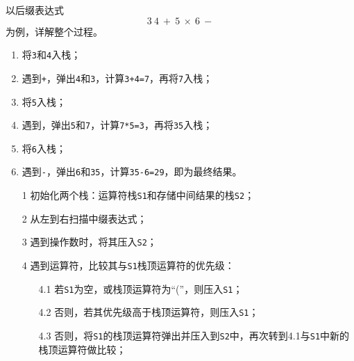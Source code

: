 \begin{frame}
\begin{li}
以后缀表达式
$$
3~4~+~5~\times~6~-
$$
为例，详解整个过程。
\end{li}
\end{frame}

\begin{frame}
\begin{enumerate}
\item 将{\tt 3}和{\tt 4}入栈；
\item 遇到{\tt +}，弹出{\tt 4}和{\tt 3}，计算{\tt 3+4=7}，再将{\tt 7}入栈；
\item 将{\tt 5}入栈；
\item 遇到{\tt *}，弹出{\tt 5}和{\tt 7}，计算{\tt 7*5=3}，再将{\tt 35}入栈；
\item 将{\tt 6}入栈；
\item 遇到{\tt -}，弹出{\tt 6}和{\tt 35}，计算{\tt 35-6=29}，即为最终结果。
\end{enumerate}
\end{frame}

\begin{frame}
\begin{itemize}
\item[1] 初始化两个栈：运算符栈{\tt S1}和存储中间结果的栈{\tt S2}；\\[0.1in]
\item[2] 从左到右扫描中缀表达式；\\[0.1in]
\item[3] 遇到操作数时，将其压入{\tt S2}；
\end{itemize}
\end{frame}

\begin{frame}
\begin{itemize}
\item[4] 遇到运算符，比较其与{\tt S1}栈顶运算符的优先级：\\[0.1in]
\begin{itemize}
\item[4.1] 若{\tt S1}为空，或栈顶运算符为“(”，则压入{\tt S1}；\\[0.1in]
\item[4.2] 否则，若其优先级高于栈顶运算符，则压入{\tt S1}；\\[0.1in]
\item[4.3] 否则，将{\tt S1}的栈顶运算符弹出并压入到{\tt S2}中，再次转到4.1与{\tt S1}中新的栈顶运算符做比较；
\end{itemize}
\end{itemize}
\end{frame}

